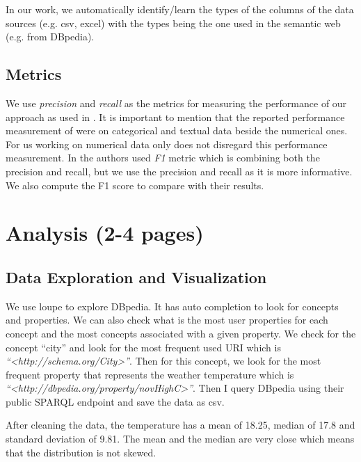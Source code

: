 \documentclass{article}
\begin{document}
In our work, we automatically identify/learn the types of the columns of the data sources (e.g. csv, excel) with the types being the one used in the semantic web (e.g. from DBpedia\cite{dbpedia-site}).


\subsection{Metrics}
We use \textit{precision} and \textit{recall} as the metrics for measuring the performance of our approach as used in \cite{karma}. It is important to mention that the reported performance measurement of \cite{karma} were on categorical and textual data beside the numerical ones. For us working on numerical data only does not disregard this performance measurement. In \cite{ann-ser-webtables} the authors used \textit{F1} metric which is combining both the precision and recall, but we use the precision and recall as it is more informative. We also compute the F1 score to compare with their results.

\section{Analysis (2-4 pages)}

\subsection{Data Exploration and Visualization}
We use loupe \cite{loupe} to explore DBpedia. It has auto completion to look for concepts and properties. We can also check what is the most user properties for each concept and the most concepts associated with a given property. We check for the concept ``city'' and look for the most frequent used URI which is \textit{``\textless http://schema.org/City\textgreater ''}. Then for this concept, we look for the most frequent property that represents the weather temperature which is \textit{``\textless http://dbpedia.org/property/novHighC\textgreater''}. Then I query DBpedia using their public SPARQL endpoint and save the data as csv. 

After cleaning the data, the temperature has a mean of 18.25, median of 17.8 and standard deviation of 9.81. The mean and the median are very close which means that the distribution is not skewed. 
\end{document}
